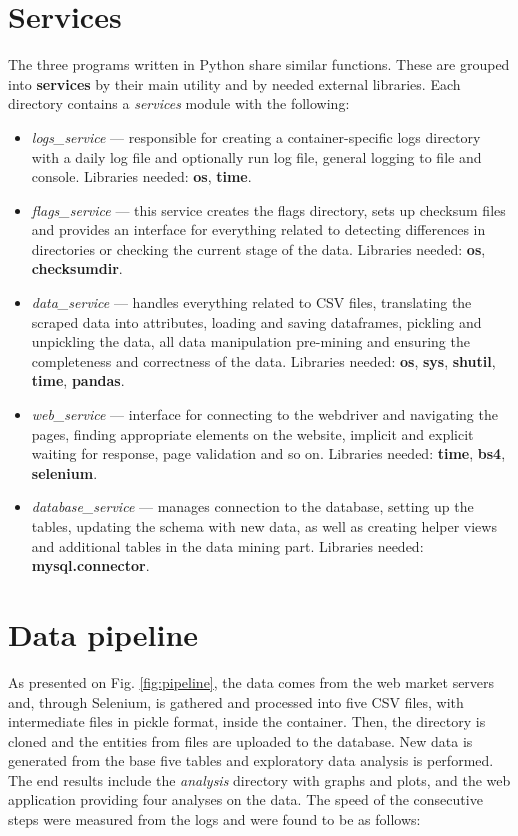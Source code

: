 \section{Services}
The three programs written in Python share similar functions. These are grouped into \textbf{services} by their main utility and by needed external libraries. Each directory contains a \textit{services} module with the following:
\begin{itemize}
\setlength\itemsep{0.3em}
\item \textit{logs\_service} --- responsible for creating a container-specific logs directory with a daily log file and optionally run log file, general logging to file and console. Libraries needed: \textbf{os}, \textbf{time}.
\item \textit{flags\_service} --- this service creates the flags directory, sets up checksum files and provides an interface for everything related to detecting differences in directories or checking the current stage of the data. Libraries needed: \textbf{os}, \textbf{checksumdir}.
\item \textit{data\_service} --- handles everything related to CSV files, translating the scraped data into attributes, loading and saving dataframes, pickling and unpickling the data, all data manipulation pre-mining and ensuring the completeness and correctness of the data. Libraries needed: \textbf{os}, \textbf{sys}, \textbf{shutil}, \textbf{time}, \textbf{pandas}.
\item \textit{web\_service} --- interface for connecting to the webdriver and navigating the pages, finding appropriate elements on the website, implicit and explicit waiting for response, page validation and so on. Libraries needed: \textbf{time}, \textbf{bs4}, \textbf{selenium}.
\item \textit{database\_service} --- manages connection to the database, setting up the tables, updating the schema with new data, as well as creating helper views and additional tables in the data mining part. Libraries needed: \textbf{mysql.connector}.
\end{itemize}

\section{Data pipeline}
As presented on Fig. \ref{fig:pipeline}, the data comes from the web market servers and, through Selenium, is gathered and processed into five CSV files, with intermediate files in pickle format, inside the container. Then, the directory is cloned and the entities from files are uploaded to the database. New data is generated from the base five tables and exploratory data analysis is performed. The end results include the \textit{analysis} directory with graphs and plots, and the web application providing four analyses on the data.
The speed of the consecutive steps were measured from the logs and were found to be as follows:

